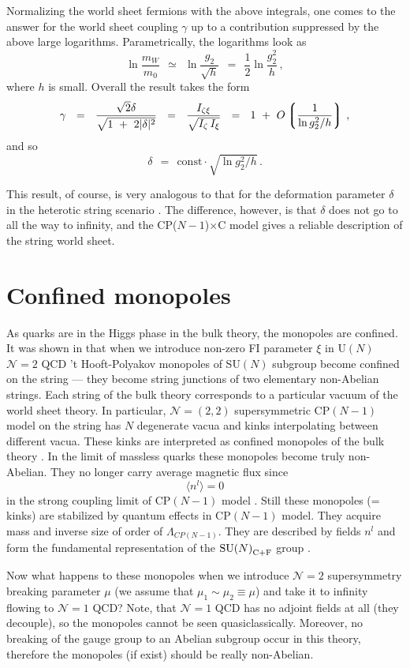 \documentclass[12pt]{article}
\def\beq{\begin{equation}}
\def\eeq{\end{equation}}
\newcommand{\ntwo}{${\mathcal N}=2$ }
\newcommand{\ntwot}{${\mathcal N}= \left(2,2\right) $ }
\newcommand{\none}{${\mathcal N}=1$ }
\newcommand{\lgr}{\left\lgroup}
\newcommand{\rgr}{\right\rgroup}
\def\cfl {$\text{SU($N$)}_{\rm C+F}$ }
\newcommand{\CPC}{CP($N-1$)$\times$C }
\begin{document}
Normalizing the world sheet fermions with the above integrals, one comes to the answer
for the world sheet coupling $ \gamma $ up to a contribution suppressed by the above large logarithms.
Parametrically, the logarithms look as
\[
	\ln \frac{m_W}{m_0}  ~~\simeq~~ 
			\ln \frac{g_2}{\sqrt{h}} ~~=~~ \frac12 \ln \frac{g_2^2}{h}\,,
\]
where $ h $ is small.
Overall the result takes the form
\[
	\gamma ~~=~~ \frac{\sqrt{2}\delta}{\sqrt{1 ~+~ 2|\delta|^2}} ~~=~~ 
		\frac{I_{\zeta\xi}}{\sqrt{I_\zeta\, I_\xi}}  ~~=~~
			1 ~+~ O\lgr \frac{1}{\ln g_2^2/h } \rgr\,,
\]
and so
\beq
\label{deltaresult}
	\delta ~~=~~ \text{const}\cdot \sqrt{\ln g_2^2/h}\,.
\eeq

This result, of course, is very analogous to that for the deformation parameter $ \delta $ 
in the heterotic string scenario \cite{SYhet,BSYhet}. 
The difference, however, is that $ \delta $ does not go to all the way to infinity, and the \CPC model 
gives a reliable description of the string world sheet. 




\section{Confined monopoles}
\setcounter{equation}{0}

As quarks are in the Higgs phase in the bulk theory, the monopoles are confined. It was shown in
\cite{Tong,SYmon,HT2} that when we introduce non-zero FI parameter $\xi$  
in U$(N)$ \ntwo QCD  't Hooft-Polyakov monopoles of SU$(N)$ subgroup become confined on the string --- 
they become string junctions of two elementary non-Abelian strings. Each string of the bulk theory corresponds to a particular vacuum of the world sheet theory. In particular, \ntwot supersymmetric CP$(N-1)$ model on the string 
has $N$ degenerate vacua and kinks interpolating between different vacua. These kinks are interpreted as 
confined monopoles of the bulk theory \cite{Tong,SYmon,HT2}. In the limit of massless quarks
these monopoles become truly non-Abelian. They no longer carry average magnetic flux since
\beq
\langle n^l\rangle =0
\eeq
in the strong coupling limit of CP$(N-1)$ model . Still these monopoles (= kinks) are stabilized by  quantum effects in CP$(N-1)$ model. 
They acquire mass and inverse size of order of $\Lambda_{CP(N-1)}$. They 
are described by fields $n^l$ and form the fundamental representation of the \cfl group \cite{W79}.

Now what happens to these monopoles when we introduce \ntwo supersymmetry breaking parameter
$\mu$ (we assume that $\mu_1\sim\mu_2\equiv\mu$) and take it to infinity flowing to \none QCD? 
Note, that \none QCD has no adjoint fields at all (they decouple), so the monopoles cannot be seen quasiclassically. 
Moreover, no breaking of the gauge group to an Abelian subgroup occur in this theory, 
therefore the monopoles (if exist) should be really non-Abelian.
\end{document}
